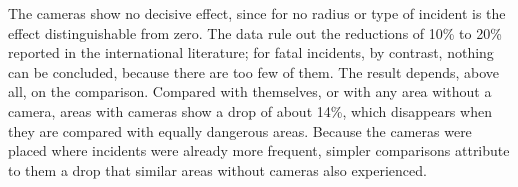 \documentclass[11pt, oneside]{book}
\begin{document}
The cameras show no decisive effect, since for no radius or type of incident is the effect distinguishable from zero. The data rule out the reductions of 10\% to 20\% reported in the international literature; for fatal incidents, by contrast, nothing can be concluded, because there are too few of them. The result depends, above all, on the comparison. Compared with themselves, or with any area without a camera, areas with cameras show a drop of about 14\%, which disappears when they are compared with equally dangerous areas. Because the cameras were placed where incidents were already more frequent, simpler comparisons attribute to them a drop that similar areas without cameras also experienced.


\tableofcontents


\listoftables

\listoffigures


\mainmatter %

\pagestyle{plain}















\appendix



\end{document}
